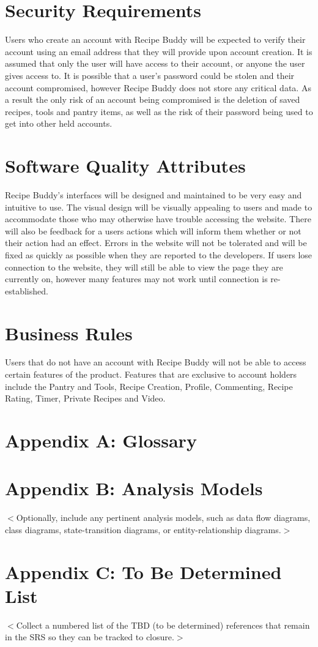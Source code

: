 \documentclass{scrreprt}
\begin{document}
\section{Security Requirements}
Users who create an account with Recipe Buddy will be expected to verify their account using an email address that they will provide upon account creation. It is assumed that only the user will have access to their account, or anyone the user gives access to. It is possible that a user's password could be stolen and their account compromised, however Recipe Buddy does not store any critical data. As a result the only risk of an account being compromised is the deletion of saved recipes, tools and pantry items, as well as the risk of their password being used to get into other held accounts.

\section{Software Quality Attributes}
Recipe Buddy's interfaces will be designed and maintained to be very easy and intuitive to use. The visual design will be visually appealing to users and made to accommodate those who may otherwise have trouble accessing the website. There will also be feedback for a users actions which will inform them whether or not their action had an effect. Errors in the website will not be tolerated and will be fixed as quickly as possible when they are reported to the developers. If users lose connection to the website, they will still be able to view the page they are currently on, however many features may not work until connection is re-established.

\section{Business Rules}
Users that do not have an account with Recipe Buddy will not be able to access certain features of the product. Features that are exclusive to account holders include the Pantry and Tools, Recipe Creation, Profile, Commenting, Recipe Rating, Timer, Private Recipes and Video.

\section{Appendix A: Glossary}
\printglossaries

\section{Appendix B: Analysis Models}
$<$Optionally, include any pertinent analysis models, such as data flow 
diagrams, class diagrams, state-transition diagrams, or entity-relationship 
diagrams.$>$

\section{Appendix C: To Be Determined List}
$<$Collect a numbered list of the TBD (to be determined) references that remain 
in the SRS so they can be tracked to closure.$>$
\end{document}

